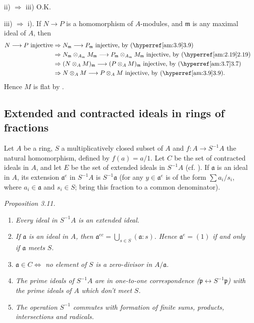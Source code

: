 ii) $\Rightarrow$ iii) O.K.

iii) $\Rightarrow$ i). If $N\longrightarrow P$ is a homomorphism of $A$-modules, and $\mathfrak m$ is any maximal ideal of $A$, then
\[
\begin{aligned}
N\longrightarrow P\text{ injective}
&\Rightarrow N_{\mathfrak m}\longrightarrow P_{\mathfrak m}\text{ injective, by \amref{3.9}}\\
&\Rightarrow N_{\mathfrak m}\otimes_{A_{\mathfrak m}}M_{\mathfrak m}\longrightarrow P_{\mathfrak m}\otimes_{A_{\mathfrak m}}M_{\mathfrak m}\text{ injective, by \amref{2.19}}\\
&\Rightarrow(N\otimes_A M)_{\mathfrak m}\longrightarrow(P\otimes_A M)_{\mathfrak m}\text{ injective, by \amref{3.7}}\\
&\Rightarrow N\otimes_A M\longrightarrow P\otimes_A M\text{ injective, by \amref{3.9}.}
\end{aligned}
\]
Hence $M$ is flat by . \proofbox

\subsection{Extended and contracted ideals in rings of fractions}

Let $A$ be a ring, $S$ a multiplicatively closed subset of $A$ and $f:A\longrightarrow S^{-1}A$ the natural homomorphism, defined by $f(a)=a/1$. Let $C$ be the set of contracted ideals in $A$, and let $E$ be the set of extended ideals in $S^{-1}A$ (cf. ). If $\mathfrak a$ is an ideal in $A$, its extension $\mathfrak a^e$ in $S^{-1}A$ is $S^{-1}\mathfrak a$ (for any $y\in\mathfrak a^e$ is of the form $\sum a_i/s_i$, where $a_i\in\mathfrak a$ and $s_i\in S$; bring this fraction to a common denominator).

\noindent\textit{Proposition 3.11.}
\begin{enumerate}
\renewcommand{\labelenumi}{\roman{enumi})}
\item \textit{Every ideal in $S^{-1}A$ is an extended ideal.}
\item \textit{If $\mathfrak a$ is an ideal in $A$, then $\mathfrak a^{ec}=\bigcup_{s\in S}(\mathfrak a:s)$. Hence $\mathfrak a^e=(1)$ if and only if $\mathfrak a$ meets $S$.}
\item \textit{$\mathfrak a\in C\Longleftrightarrow$ no element of $S$ is a zero-divisor in $A/\mathfrak a$.}
\item \textit{The prime ideals of $S^{-1}A$ are in one-to-one correspondence ($\mathfrak p\longleftrightarrow S^{-1}\mathfrak p$) with the prime ideals of $A$ which don't meet $S$.}
\item \textit{The operation $S^{-1}$ commutes with formation of finite sums, products, intersections and radicals.}
\end{enumerate}

